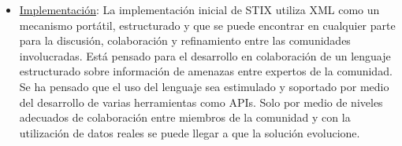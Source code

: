\begin{itemize}
\item \underline{Implementación}: La implementación inicial de STIX utiliza XML como un mecanismo portátil, 
estructurado y que se puede encontrar en cualquier parte para la discusión, 
colaboración y refinamiento entre las comunidades involucradas. Está pensado 
para el desarrollo en colaboración de un lenguaje estructurado sobre información de 
amenazas entre expertos de la comunidad. Se ha pensado que el uso del lenguaje 
sea estimulado y soportado por medio del desarrollo de varias herramientas como 
APIs. Solo por medio de niveles adecuados de colaboración entre miembros de la 
comunidad y con la utilización de datos reales se puede llegar a que la solución 
evolucione.
\end{itemize}








